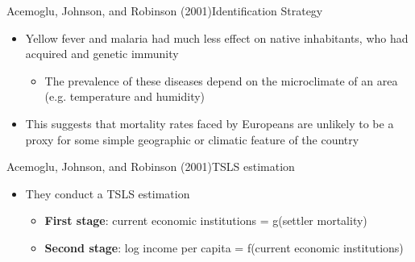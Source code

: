 \documentclass[dvipsnames,hyperref={pdfpagelabels=false}]{beamer}
\begin{document}
\begin{frame}{Acemoglu, Johnson, and Robinson (2001)}{Identification Strategy}
	\begin{itemize}
		
		\item Yellow fever and malaria had much less effect on native inhabitants, who had acquired and genetic immunity
		\vspace{0.2cm}
			\begin{itemize}
		\item  The prevalence of these diseases depend on the microclimate  of an area (e.g. temperature and 
		humidity)
		\vspace{0.2cm}
			\end{itemize}
		\item This suggests that mortality rates faced by Europeans are unlikely to be a proxy for some simple geographic or climatic feature of the country 
		
		
	\end{itemize}
\end{frame}



\begin{frame}{Acemoglu, Johnson, and Robinson (2001)}{TSLS estimation}
	\begin{itemize}
		
		\item They conduct a TSLS estimation
		\vspace{0.2cm}
			\begin{itemize}
		\item \textbf{First stage}: current economic institutions = g(settler mortality)
		\vspace{0.2cm}
		\item \textbf{Second stage}: log income per capita = f(current economic institutions)
			\end{itemize}
	\end{itemize}
\end{frame}
\end{document}
